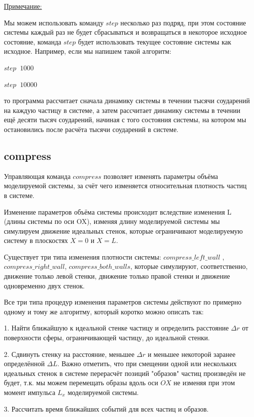 \documentclass[a4paper]{article}
\begin{document}
\uline{Примечание:}

Мы можем использовать команду $ step $ несколько раз подряд, при этом состояние системы каждый раз не будет сбрасываться и возвращаться в некоторое исходное состояние, команда $ step $ будет использовать текущее состояние системы как исходное. Например, если мы напишем такой алгоритм:

$ step \;\; 1000 $

$ step \;\; 10000 $

то программа рассчитает сначала динамику системы в течении тысячи соударений на каждую частицу в системе, а затем рассчитает динамику системы в течении ещё десяти тысяч соударений, начиная с того состояния системы, на котором мы остановились после расчёта тысячи соударений в системе.

\subsection{compress}
Управляющая команда $ compress $ позволяет изменять параметры объёма моделируемой системы, за счёт чего изменяется относительная плотность частиц в системе. 

Изменение параметров объёма системы происходит вследствие изменения L (длины системы по оси OX), изменяя длину моделируемой системы мы симулируем движение идеальных стенок, которые ограничивают моделируемую систему в плоскостях $ X = 0 $ и $ X = L $.

Существует три типа изменения плотности системы: $ compress\_left\_wall $ , $ compress\_right\_wall $, $ compress\_both\_walls $, которые симулируют, соответственно, движение только левой стенки, движение только правой стенки и движение одновременно двух стенок.

Все три типа процедур изменения параметров системы действуют по примерно одному и тому же алгоритму, который коротко можно описать так:

1. Найти ближайшую к идеальной стенке частицу и определить расстояние $ \Delta r $ от поверхности сферы, ограничивающей частицу, до идеальной стенки.

2. Сдвинуть стенку на расстояние, меньшее $ \Delta r $ и меньшее некоторой заранее определённой $ \Delta L $. Важно отметить, что при смещении одной или нескольких идеальных стенок в системе перерасчёт позиций "образов" частиц произведён не будет, т.к. мы можем перемещать образы вдоль оси $ OX $ не изменяя при этом момент импульса $ L_x $ моделируемой системы.

3. Рассчитать время ближайших событий для всех частиц и образов. 
\end{document}
